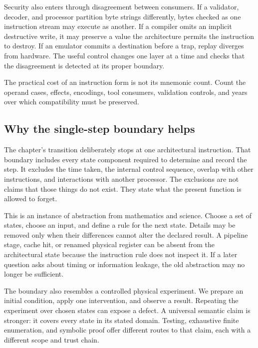 Security also enters through disagreement between consumers. If a validator,
decoder, and processor partition byte strings differently, bytes checked as
one instruction stream may execute as another. If a compiler omits an
implicit destructive write, it may preserve a value the architecture permits the
instruction to destroy. If an emulator commits a destination before a trap,
replay diverges from hardware. The useful control changes one layer at a time
and checks that the disagreement is detected at its proper boundary.

\begin{keyidea}[title={Count the maintained contracts}]
The practical cost of an instruction form is not its mnemonic count. Count
the operand cases, effects, encodings, tool consumers, validation controls,
and years over which compatibility must be preserved.
\end{keyidea}

\subsection{Why the single-step boundary helps}

The chapter's transition deliberately stops at one architectural instruction.
That boundary includes every state component required to determine and record
the step. It excludes the time taken, the internal control sequence, overlap
with other instructions, and interactions with another processor. The
exclusions are not claims that those things do not exist. They state what the
present function is allowed to forget.

This is an instance of abstraction from mathematics and science. Choose a set
of states, choose an input, and define a rule for the next state. Details may
be removed only when their differences cannot alter the declared result. A
pipeline stage, cache hit, or renamed physical register can be absent from the
architectural state because the instruction rule does not inspect it. If a
later question asks about timing or information leakage, the old abstraction
may no longer be sufficient.

The boundary also resembles a controlled physical experiment. We prepare an
initial condition, apply one intervention, and observe a result. Repeating the
experiment over chosen states can expose a defect. A universal semantic claim
is stronger: it covers every state in its stated domain. Testing, exhaustive
finite enumeration, and symbolic proof offer different routes to that claim,
each with a different scope and trust chain.

